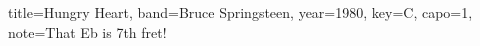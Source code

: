 \documentclass{skrul-leadsheet}
\begin{document}
\begin{song}[transpose-capo=true,enharmonic=flat]{title={Hungry Heart}, band={Bruce Springsteen}, year={1980}, key={C}, capo={1}, note={That Eb is 7th fret!}}



\end{song}
\end{document}
